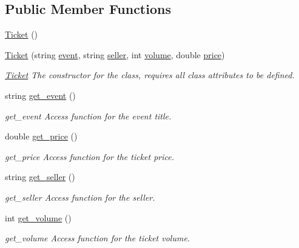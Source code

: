 \subsection*{Public Member Functions}
\begin{DoxyCompactItemize}
\item 
\hyperlink{class_ticket_acb3217611e420c807c693f3e7995a6fb}{Ticket} ()
\item 
\hyperlink{class_ticket_af7970b7b7045eed437759b1b16560c7c}{Ticket} (string \hyperlink{class_ticket_ae2d7d5c62721303e8a6fa492dc21a65f}{event}, string \hyperlink{class_ticket_a8cdc0977faad029fbb45ab09035319b9}{seller}, int \hyperlink{class_ticket_aed48ca0bcd2162fd4fd495873e2631f5}{volume}, double \hyperlink{class_ticket_a80d1e9b73edf0b6c8aa055cb5cdaa2f2}{price})
\begin{DoxyCompactList}\small\item\em \hyperlink{class_ticket}{Ticket} The constructor for the class, requires all class attributes to be defined. \end{DoxyCompactList}\item 
string \hyperlink{class_ticket_a7d92689260064db0b8263acbe3370271}{get\-\_\-event} ()
\begin{DoxyCompactList}\small\item\em get\-\_\-event Access function for the event title. \end{DoxyCompactList}\item 
double \hyperlink{class_ticket_a91c1ecd18b9ca25105da73692f04085e}{get\-\_\-price} ()
\begin{DoxyCompactList}\small\item\em get\-\_\-price Access function for the ticket price. \end{DoxyCompactList}\item 
string \hyperlink{class_ticket_a1a250452fb9bf26f05f98bfdf463bbe1}{get\-\_\-seller} ()
\begin{DoxyCompactList}\small\item\em get\-\_\-seller Access function for the seller. \end{DoxyCompactList}\item 
int \hyperlink{class_ticket_a48ce708d66cc141bd2fded62e66f2771}{get\-\_\-volume} ()
\begin{DoxyCompactList}\small\item\em get\-\_\-volume Access function for the ticket volume. \end{DoxyCompactList}\end{DoxyCompactItemize}
